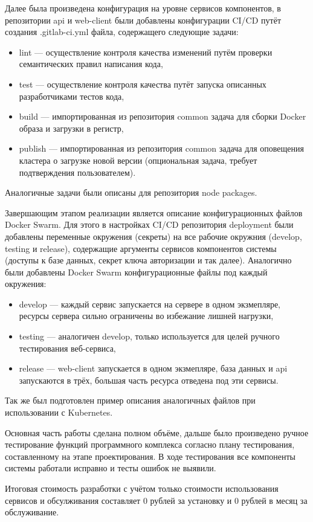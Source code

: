 Далее была произведена конфигурация на уровне сервисов компонентов, в репозитории api и web-client были добавлены конфигурации CI/CD путёт создания .gitlab-ci.yml файла, содержащего следующие задачи:
\begin{itemize}
    \item lint --- осуществление контроля качества изменений путём проверки семантических правил написания кода,
    \item test --- осуществление контроля качества путёт запуска описанных разработчиками тестов кода,
    \item build --- импортированная из репозитория common задача для сборки Docker образа и загрузки в регистр,
    \item publish --- импортированная из репозитория common задача для оповещения кластера о загрузке новой версии (опциональная задача, требует подтверждения пользователем).
\end{itemize}

Аналогичные задачи были описаны для репозитория node packages.

Завершающим этапом реализации является описание конфигурационных файлов Docker Swarm.
Для этого в настройках CI/CD репозитория deployment были добавлены переменные окружения (секреты) на все рабочие окружния (develop, testing и release),
содержащие аргументы сервисов компонентов системы (доступы к базе данных, секрет ключа авторизации и так далее).
Аналогично были добавлены Docker Swarm конфигурационные файлы под каждый окружения:

\begin{itemize}
    \item develop --- каждый сервис запускается на сервере в одном экзмепляре, ресурсы сервера сильно ограничены во избежание лишней нагрузки,
    \item testing --- аналогичен develop, только используется для целей ручного тестирования веб-сервиса,
    \item release --- web-client запускается в одном экзмепляре, база данных и api запускаются в трёх, большая часть ресурса отведена под эти сервисы.
\end{itemize}

Так же был подготовлен пример описания аналогичных файлов при использовании с Kubernetes.

Основная часть работы сделана полном объёме, дальше было произведено ручное тестирование функций программного комплекса согласно плану тестирования, составленному на этапе проектирования.
В ходе тестирования все компоненты системы работали исправно и тесты ошибок не выявили.

Итоговая стоимость разработки с учётом только стоимости использования сервисов и обсулживания составляет 0 рублей за установку и 0 рублей в месяц за обслуживание.









